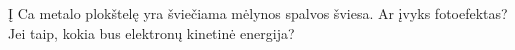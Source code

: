 \question Į Ca metalo plokštelę yra šviečiama mėlynos spalvos šviesa. Ar įvyks fotoefektas? Jei taip, kokia bus elektronų kinetinė energija?